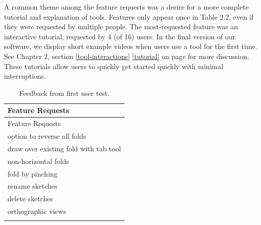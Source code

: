 A common theme among the feature requests was a desire for a more
complete tutorial and explanation of tools. Features only appear once in
Table 2.2, even if they were requested by multiple people. The
most-requested feature was an interactive tutorial, requested by 4 (of
16) users. In the final version of our software, we display short
example videos when users use a tool for the first time. See Chapter 2,
section \ref{tool-interactions} \ref{tutorial}  on
page \pageref{tutorial} for more discussion. These tutorials allow users
to quickly get started quickly with minimal interruptions.

\begin{longtable}[c]{@{}l@{}}
\caption{Feedback from first user test.}\tabularnewline
\toprule
\begin{minipage}[b]{0.82\columnwidth}\raggedright\strut
Feature Requests
\strut\end{minipage}\tabularnewline
\midrule
\endfirsthead
\toprule
\begin{minipage}[b]{0.82\columnwidth}\raggedright\strut
Feature Requests
\strut\end{minipage}\tabularnewline
\midrule
\endhead
\begin{minipage}[t]{0.82\columnwidth}\raggedright\strut
option to reverse all folds
\strut\end{minipage}\tabularnewline
\begin{minipage}[t]{0.82\columnwidth}\raggedright\strut
draw over existing fold with tab tool
\strut\end{minipage}\tabularnewline
\begin{minipage}[t]{0.82\columnwidth}\raggedright\strut
non-horizontal folds
\strut\end{minipage}\tabularnewline
\begin{minipage}[t]{0.82\columnwidth}\raggedright\strut
fold by pinching
\strut\end{minipage}\tabularnewline
\begin{minipage}[t]{0.82\columnwidth}\raggedright\strut
rename sketches
\strut\end{minipage}\tabularnewline
\begin{minipage}[t]{0.82\columnwidth}\raggedright\strut
delete sketches
\strut\end{minipage}\tabularnewline
\begin{minipage}[t]{0.82\columnwidth}\raggedright\strut
orthographic views
\strut\end{minipage}\tabularnewline
\begin{minipage}[t]{0.82\columnwidth}\raggedright\strut

\end{minipage}
\end{longtable}

